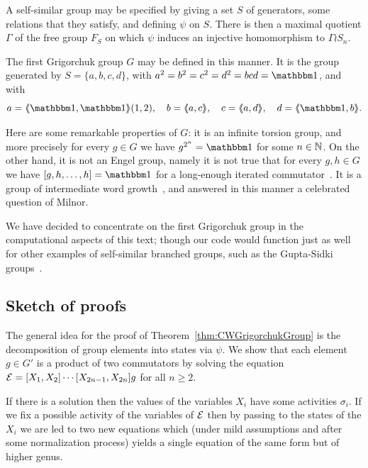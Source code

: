\documentclass[a4paper,11pt]{amsart}
\begin{document}
A self-similar group may be specified by giving a set $S$ of
generators, some relations that they satisfy, and defining $\psi$ on
$S$. There is then a maximal quotient $\Gamma$ of the free group $F_S$
on which $\psi$ induces an injective homomorphism to $\Gamma\wr S_n$.

The first Grigorchuk group $G$ may be defined in this manner. It is
the group generated by $S=\{a,b,c,d\}$, with $a^2=b^2=c^2=d^2=bcd=\id$,
and with
\[a=\pair{\id,\id}(1,2),\quad b=\pair{a,c},\quad c=\pair{a,d},\quad d=\pair{\id,b}. \]

Here are some remarkable properties of $G$: it is an infinite torsion
group, and more precisely for every $g\in G$ we have $g^{2^n}=\id$ for
some $n\in\mathbb{N}$. On the other hand, it is not an Engel group, namely it
is not true that for every $g,h\in G$ we have $[g,h,\dots,h]=\id$ for
a long-enough iterated commutator~\cite{Bartholdi:Engel}. It is a
group of intermediate word growth~\cite{Grigorchuk:Milnor}, and
answered in this manner a celebrated question of Milnor.

We have decided to concentrate on the first Grigorchuk group in the
computational aspects of this text; though our code would function
just as well for other examples of self-similar branched groups, such
as the Gupta-Sidki groups~\cite{Gupta-Sidki:PGroups}.


\subsection{Sketch of proofs}
The general idea for the proof of Theorem~\ref{thm:CWGrigorchukGroup}
is the decomposition of group elements into states via $\psi$. We show
that each element $g\in G'$ is a product of two commutators by solving
the equation $\mathcal{E}=[X_1,X_2]\cdots[X_{2n-1},X_{2n}]g$ for all
$n\geq 2$.

If there is a solution then the values of the variables $X_i$ have
some activities $\sigma_i$. If we fix a possible activity of the
variables of $\mathcal{E}$ then by passing to the states of the $X_i$ we are
led to two new equations which (under mild assumptions and after some
normalization process) yields a single equation of the same form but
of higher genus.
\end{document}
